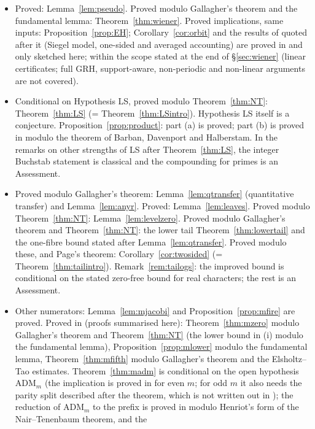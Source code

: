 \documentclass[11pt,reqno]{amsart}
\theoremstyle{definition}
\begin{document}
\begin{itemize}
proved statements within their scopes, Assessment as a description of the
mechanism.
\item Proved: Lemma~\ref{lem:pseudo}.  Proved modulo Gallagher's theorem and
the fundamental lemma: Theorem~\ref{thm:wiener}.  Proved implications, same
inputs: Proposition~\ref{prop:EH}; Corollary~\ref{cor:orbit} and the results of
\cite{O15} quoted after it (Siegel model, one-sided and averaged
accounting) are proved in \cite{O15} and only sketched here; within the scope stated at the end
of \S\ref{sec:wiener} (linear certificates; full GRH, support-aware,
non-periodic and non-linear arguments are not covered).
\item Conditional on Hypothesis LS, proved modulo Theorem~\ref{thm:NT}:
Theorem~\ref{thm:LS} (= Theorem~\ref{thm:LSintro}).  Hypothesis LS itself is a
conjecture.  Proposition~\ref{prop:product}: part (a) is proved; part (b) is
proved in \cite{O16} modulo the theorem of Barban, Davenport and
Halberstam.  In the remarks on other strengths of LS after
Theorem~\ref{thm:LS}, the integer Buchstab statement is classical and the
compounding for primes is an Assessment.
\item Proved modulo Gallagher's theorem: Lemma~\ref{lem:qtransfer} (quantitative
transfer) and Lemma~\ref{lem:anyr}.  Proved: Lemma~\ref{lem:leaves}.  Proved modulo
Theorem~\ref{thm:NT}: Lemma~\ref{lem:levelzero}.  Proved modulo Gallagher's theorem
and Theorem~\ref{thm:NT}: the lower tail Theorem~\ref{thm:lowertail} and the one-fibre
bound stated after Lemma~\ref{lem:qtransfer}.  Proved modulo
these, \cite{TQ} and Page's theorem: Corollary~\ref{cor:twosided}
(= Theorem~\ref{thm:tailintro}).  Remark~\ref{rem:tailogs}: the improved bound is
conditional on the stated zero-free bound for real characters; the rest is
an Assessment.
\item Other numerators: Lemma~\ref{lem:mjacobi} and Proposition~\ref{prop:mfire}
are proved.  Proved in \cite{MN} (proofs summarised here):
Theorem~\ref{thm:mzero} modulo Gallagher's theorem and Theorem~\ref{thm:NT} (the
lower bound in (i) modulo the fundamental lemma), Proposition~\ref{prop:mlower}
modulo the fundamental lemma, Theorem~\ref{thm:mfifth} modulo Gallagher's
theorem and the Elsholtz--Tao estimates.  Theorem~\ref{thm:madm} is
conditional on the open hypothesis $\mathrm{ADM}_m$ (the implication is proved
in \cite{MN} for even $m$; for odd $m$ it also needs the parity split described
after the theorem, which is not written out in \cite{MN}); the reduction of $\mathrm{ADM}_m$ to the prefix is proved in
\cite{MN2} modulo Henriot's form of the Nair--Tenenbaum theorem, and the

\end{itemize}
\end{document}
